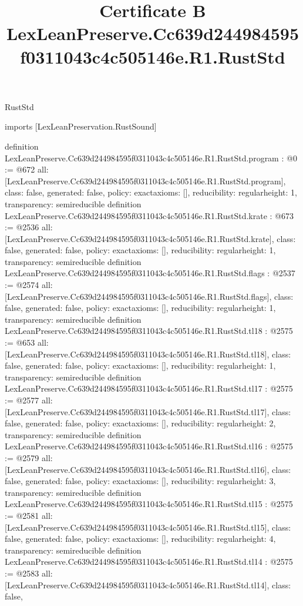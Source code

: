 \begin{lexlean}{RustStd}
\title{Certificate B LexLeanPreserve.Cc639d244984595f0311043c4c505146e.R1.RustStd}
\begin{coremodule}
imports [LexLeanPreservation.RustSound]

definition LexLeanPreserve.Cc639d244984595f0311043c4c505146e.R1.RustStd.program : @0 := @672 {
  all: [LexLeanPreserve.Cc639d244984595f0311043c4c505146e.R1.RustStd.program],
  class: false,
  generated: false,
  policy: exact{axioms: []},
  reducibility: regular{height: 1},
  transparency: semireducible
}
definition LexLeanPreserve.Cc639d244984595f0311043c4c505146e.R1.RustStd.krate : @673 := @2536 {
  all: [LexLeanPreserve.Cc639d244984595f0311043c4c505146e.R1.RustStd.krate],
  class: false,
  generated: false,
  policy: exact{axioms: []},
  reducibility: regular{height: 1},
  transparency: semireducible
}
definition LexLeanPreserve.Cc639d244984595f0311043c4c505146e.R1.RustStd.flags : @2537 := @2574 {
  all: [LexLeanPreserve.Cc639d244984595f0311043c4c505146e.R1.RustStd.flags],
  class: false,
  generated: false,
  policy: exact{axioms: []},
  reducibility: regular{height: 1},
  transparency: semireducible
}
definition LexLeanPreserve.Cc639d244984595f0311043c4c505146e.R1.RustStd.tl18 : @2575 := @653 {
  all: [LexLeanPreserve.Cc639d244984595f0311043c4c505146e.R1.RustStd.tl18],
  class: false,
  generated: false,
  policy: exact{axioms: []},
  reducibility: regular{height: 1},
  transparency: semireducible
}
definition LexLeanPreserve.Cc639d244984595f0311043c4c505146e.R1.RustStd.tl17 : @2575 := @2577 {
  all: [LexLeanPreserve.Cc639d244984595f0311043c4c505146e.R1.RustStd.tl17],
  class: false,
  generated: false,
  policy: exact{axioms: []},
  reducibility: regular{height: 2},
  transparency: semireducible
}
definition LexLeanPreserve.Cc639d244984595f0311043c4c505146e.R1.RustStd.tl16 : @2575 := @2579 {
  all: [LexLeanPreserve.Cc639d244984595f0311043c4c505146e.R1.RustStd.tl16],
  class: false,
  generated: false,
  policy: exact{axioms: []},
  reducibility: regular{height: 3},
  transparency: semireducible
}
definition LexLeanPreserve.Cc639d244984595f0311043c4c505146e.R1.RustStd.tl15 : @2575 := @2581 {
  all: [LexLeanPreserve.Cc639d244984595f0311043c4c505146e.R1.RustStd.tl15],
  class: false,
  generated: false,
  policy: exact{axioms: []},
  reducibility: regular{height: 4},
  transparency: semireducible
}
definition LexLeanPreserve.Cc639d244984595f0311043c4c505146e.R1.RustStd.tl14 : @2575 := @2583 {
  all: [LexLeanPreserve.Cc639d244984595f0311043c4c505146e.R1.RustStd.tl14],
  class: false,
}
\end{coremodule}
\end{lexlean}
